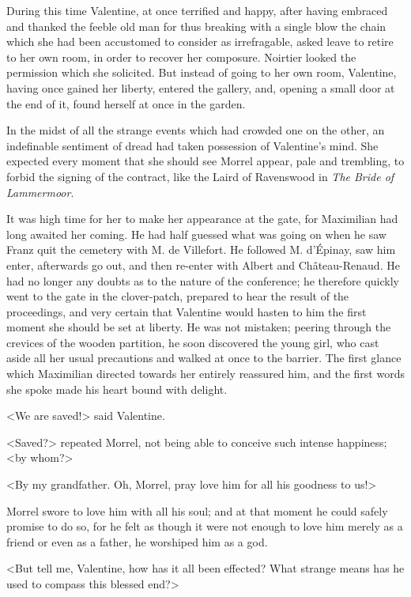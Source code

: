  During this time Valentine, at once terrified and happy, after having embraced and thanked the feeble old man for thus breaking with a single blow the chain which she had been accustomed to consider as irrefragable, asked leave to retire to her own room, in order to recover her composure. Noirtier looked the permission which she solicited. But instead of going to her own room, Valentine, having once gained her liberty, entered the gallery, and, opening a small door at the end of it, found herself at once in the garden. 

 In the midst of all the strange events which had crowded one on the other, an indefinable sentiment of dread had taken possession of Valentine's mind. She expected every moment that she should see Morrel appear, pale and trembling, to forbid the signing of the contract, like the Laird of Ravenswood in \textit{The Bride of Lammermoor}. 

 It was high time for her to make her appearance at the gate, for Maximilian had long awaited her coming. He had half guessed what was going on when he saw Franz quit the cemetery with M. de Villefort. He followed M. d'Épinay, saw him enter, afterwards go out, and then re-enter with Albert and Château-Renaud. He had no longer any doubts as to the nature of the conference; he therefore quickly went to the gate in the clover-patch, prepared to hear the result of the proceedings, and very certain that Valentine would hasten to him the first moment she should be set at liberty. He was not mistaken; peering through the crevices of the wooden partition, he soon discovered the young girl, who cast aside all her usual precautions and walked at once to the barrier. The first glance which Maximilian directed towards her entirely reassured him, and the first words she spoke made his heart bound with delight. 

 <We are saved!> said Valentine. 

 <Saved?> repeated Morrel, not being able to conceive such intense happiness; <by whom?> 

 <By my grandfather. Oh, Morrel, pray love him for all his goodness to us!> 

 Morrel swore to love him with all his soul; and at that moment he could safely promise to do so, for he felt as though it were not enough to love him merely as a friend or even as a father, he worshiped him as a god. 

 <But tell me, Valentine, how has it all been effected? What strange means has he used to compass this blessed end?> 


